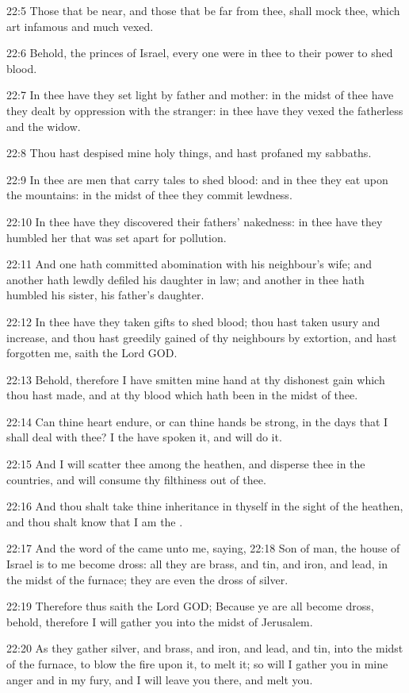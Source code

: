22:5 Those that be near, and those that be far from thee, shall mock thee, which art infamous and much vexed.

22:6 Behold, the princes of Israel, every one were in thee to their power to shed blood.

22:7 In thee have they set light by father and mother: in the midst of thee have they dealt by oppression with the stranger: in thee have they vexed the fatherless and the widow.

22:8 Thou hast despised mine holy things, and hast profaned my sabbaths.

22:9 In thee are men that carry tales to shed blood: and in thee they eat upon the mountains: in the midst of thee they commit lewdness.

22:10 In thee have they discovered their fathers' nakedness: in thee have they humbled her that was set apart for pollution.

22:11 And one hath committed abomination with his neighbour's wife; and another hath lewdly defiled his daughter in law; and another in thee hath humbled his sister, his father's daughter.

22:12 In thee have they taken gifts to shed blood; thou hast taken usury and increase, and thou hast greedily gained of thy neighbours by extortion, and hast forgotten me, saith the Lord GOD.

22:13 Behold, therefore I have smitten mine hand at thy dishonest gain which thou hast made, and at thy blood which hath been in the midst of thee.

22:14 Can thine heart endure, or can thine hands be strong, in the days that I shall deal with thee? I the \LORD have spoken it, and will do it.

22:15 And I will scatter thee among the heathen, and disperse thee in the countries, and will consume thy filthiness out of thee.

22:16 And thou shalt take thine inheritance in thyself in the sight of the heathen, and thou shalt know that I am the \LORD.

22:17 And the word of the \LORD came unto me, saying, 22:18 Son of man, the house of Israel is to me become dross: all they are brass, and tin, and iron, and lead, in the midst of the furnace; they are even the dross of silver.

22:19 Therefore thus saith the Lord GOD; Because ye are all become dross, behold, therefore I will gather you into the midst of Jerusalem.

22:20 As they gather silver, and brass, and iron, and lead, and tin, into the midst of the furnace, to blow the fire upon it, to melt it; so will I gather you in mine anger and in my fury, and I will leave you there, and melt you.


